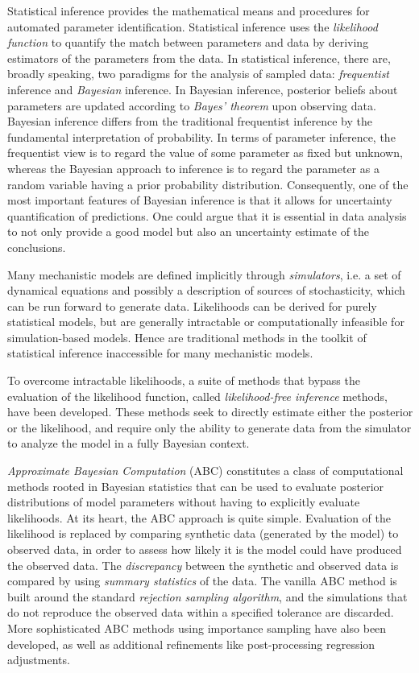 Statistical inference provides the mathematical means and procedures for automated parameter identification.  Statistical inference uses the \textit{likelihood function} to quantify the match between parameters and data by deriving estimators of the parameters from the data. In statistical inference, there are, broadly speaking, two paradigms for the analysis of sampled data: \textit{frequentist} inference and \textit{Bayesian} inference. In Bayesian inference, posterior beliefs about parameters are updated according to \textit{Bayes' theorem} upon observing data. Bayesian inference differs from the traditional frequentist inference by the fundamental interpretation of probability. In terms of parameter inference, the frequentist view is to regard the value of some parameter as fixed but unknown, whereas the Bayesian approach to inference is to regard the parameter as a random variable having a prior probability distribution. Consequently, one of the most important features of Bayesian inference is that it allows for uncertainty quantification of predictions. One could argue that it is essential in data analysis to not only provide a good model but also an uncertainty estimate of the conclusions. 

Many mechanistic models are defined implicitly through \textit{simulators}, i.e. a set of dynamical equations and possibly a description of sources of stochasticity, which can be run forward to generate data. Likelihoods can be derived for purely statistical models, but are generally intractable or computationally infeasible for simulation-based models. Hence are traditional methods in the toolkit of statistical inference inaccessible for many mechanistic models.

To overcome intractable likelihoods, a suite of methods that bypass the evaluation of the likelihood function, called \textit{likelihood-free inference} methods, have been developed. These methods seek to directly estimate either the posterior or the likelihood, and require only the ability to generate data from the simulator to analyze the model in a fully Bayesian context. 

\textit{Approximate Bayesian Computation} (ABC) constitutes a class of computational methods rooted in Bayesian statistics that can be used to evaluate posterior distributions of model parameters without having to explicitly evaluate likelihoods. At its heart, the ABC approach is quite simple. Evaluation of the likelihood is replaced by comparing synthetic data (generated by the model) to observed data, in order to assess how likely it is the model could have produced the observed data. The \textit{discrepancy} between the synthetic and observed data is compared by using \textit{summary statistics} of the data. The vanilla ABC method is built around the standard \textit{rejection sampling algorithm}, and the simulations that do not reproduce the observed data within a specified tolerance are discarded. More sophisticated ABC methods using importance sampling have also been developed, as well as additional refinements like post-processing regression adjustments. 

